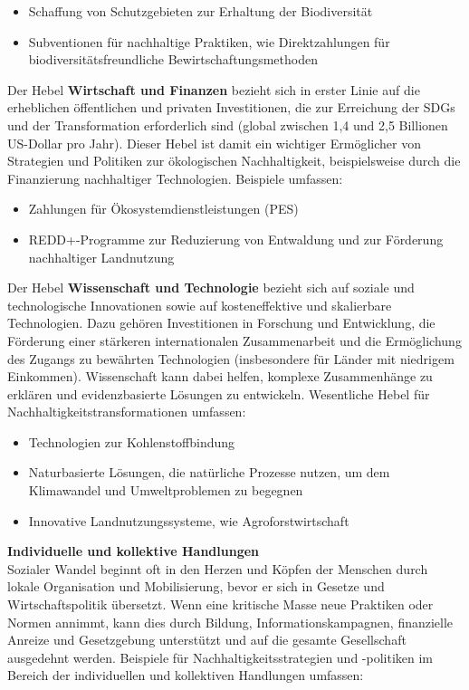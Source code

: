 \documentclass[
  nswissgerman,
  a4paper,
  DIV=11,
  numbers=noendperiod,
  oneside,
  openany]{scrreprt}
\begin{document}
\begin{itemize}
\item
  Schaffung von Schutzgebieten zur Erhaltung der Biodiversität
\item
  Subventionen für nachhaltige Praktiken, wie Direktzahlungen für
  biodiversitätsfreundliche Bewirtschaftungsmethoden
\end{itemize}

Der Hebel \textbf{Wirtschaft und Finanzen} bezieht sich in erster Linie
auf die erheblichen öffentlichen und privaten Investitionen, die zur
Erreichung der SDGs und der Transformation erforderlich sind (global
zwischen 1,4 und 2,5 Billionen US-Dollar pro Jahr). Dieser Hebel ist
damit ein wichtiger Ermöglicher von Strategien und Politiken zur
ökologischen Nachhaltigkeit, beispielsweise durch die Finanzierung
nachhaltiger Technologien. Beispiele umfassen:

\begin{itemize}
\item
  Zahlungen für Ökosystemdienstleistungen (PES)
\item
  REDD+-Programme zur Reduzierung von Entwaldung und zur Förderung
  nachhaltiger Landnutzung
\end{itemize}

Der Hebel \textbf{Wissenschaft und Technologie} bezieht sich auf soziale
und technologische Innovationen sowie auf kosteneffektive und
skalierbare Technologien. Dazu gehören Investitionen in Forschung und
Entwicklung, die Förderung einer stärkeren internationalen
Zusammenarbeit und die Ermöglichung des Zugangs zu bewährten
Technologien (insbesondere für Länder mit niedrigem Einkommen).
Wissenschaft kann dabei helfen, komplexe Zusammenhänge zu erklären und
evidenzbasierte Lösungen zu entwickeln. Wesentliche Hebel für
Nachhaltigkeitstransformationen umfassen:

\begin{itemize}
\item
  Technologien zur Kohlenstoffbindung
\item
  Naturbasierte Lösungen, die natürliche Prozesse nutzen, um dem
  Klimawandel und Umweltproblemen zu begegnen
\item
  Innovative Landnutzungssysteme, wie Agroforstwirtschaft
\end{itemize}

\textbf{Individuelle und kollektive Handlungen}\\
Sozialer Wandel beginnt oft in den Herzen und Köpfen der Menschen durch
lokale Organisation und Mobilisierung, bevor er sich in Gesetze und
Wirtschaftspolitik übersetzt. Wenn eine kritische Masse neue Praktiken
oder Normen annimmt, kann dies durch Bildung, Informationskampagnen,
finanzielle Anreize und Gesetzgebung unterstützt und auf die gesamte
Gesellschaft ausgedehnt werden. Beispiele für Nachhaltigkeitsstrategien
und -politiken im Bereich der individuellen und kollektiven Handlungen
umfassen:
\end{document}
